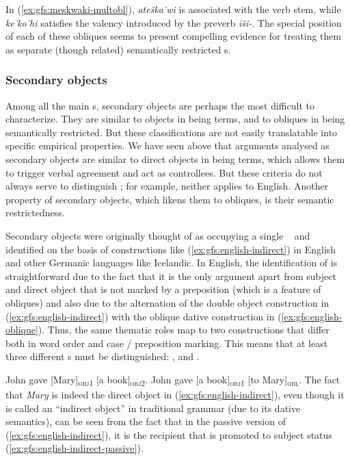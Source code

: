 \documentclass[output=paper]{../langscibook}
\begin{document}
 In (\ref{ex:gfs:meskwaki-multobl}), \textit{ateška˙wi} is associated with the verb stem, while \textit{ke˙ko˙hi} satisfies the valency introduced by the preverb \textit{iši-}. The special position of each of these obliques seems to present compelling evidence for treating them as separate (though related) semantically restricted {\GF}s.
 
 \subsubsection{Secondary objects\label{sect:gfs:obj2}}
 
 Among all the main {\GF}s, secondary objects are perhaps the most difficult to characterize. They are similar to objects in being terms, and to obliques in being semantically restricted. But these classifications are not easily translatable into specific empirical properties. We have seen above that arguments analysed as secondary objects are similar to direct objects in being terms, which allows them to trigger verbal agreement and act as controllees. But these criteria do not always serve to distinguish {\OBJTHETA}; for example, neither applies to English. Another property of secondary objects, which likens them to obliques, is their semantic restrictedness.
 
 Secondary objects were originally thought of as occupying a single \GF\ {} \citep{kaplanbresnan82} and identified on the basis of constructions like (\ref{ex:gfs:english-indirect}) in English and other Germanic languages like Icelandic. In English, the identification of {} is straightforward due to the fact that it is the only argument apart from subject and direct object that is not marked by a preposition (which is a feature of obliques) and also due to the alternation of the double object construction in (\ref{ex:gfs:english-indirect}) with the oblique dative construction in (\ref{ex:gfs:english-oblique}). Thus, the same thematic roles map to two constructions that differ both in word order and case / preposition marking. This means that at least three different {\GF}s must be distinguished: \OBJ, {\OBLTHETA} and {\OBJTHETA}.
 
 \ea\label{ex:gfs:english-indirect}
    John gave [Mary]\textsubscript{\textsc{obj1}} [a book]\textsubscript{\textsc{obj2}}.
    \ex\label{ex:gfs:english-oblique} John gave [a book]\textsubscript{\textsc{obj1}} [to Mary]\textsubscript{\textsc{obl}}.
 \z
The fact that \textit{Mary} is indeed the direct object in (\ref{ex:gfs:english-indirect}), even though it is called an ``indirect object'' in traditional grammar (due to its dative semantics), can be seen from the fact that in the passive version of (\ref{ex:gfs:english-indirect}), it is the recipient that is promoted to subject status (\ref{ex:gfs:english-indirect-passive}).
 
\end{document}
